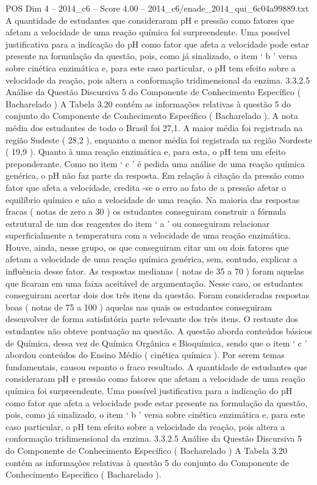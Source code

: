 \begin{textsample}{POS Dim 4 – 2014\_c6 – Score 4.00 – 2014\_c6/enade\_2014\_qui\_6c04a99889.txt}
A quantidade de estudantes que consideraram pH e pressão como fatores que afetam a velocidade de uma reação química foi surpreendente.
Uma possível justificativa para a indicação do pH como fator que afeta a velocidade pode estar presente na formulação da questão, pois, como já sinalizado, o item ‘ b ’ versa sobre cinética enzimática e, para este caso particular, o pH tem efeito sobre a velocidade da reação, pois altera a conformação tridimensional da enzima. 3.3.2.5 Análise da Questão Discursiva 5 do Componente de Conhecimento Específico ( Bacharelado ) A Tabela 3.20 contém as informações relativas à questão 5 do conjunto do Componente de Conhecimento Específico ( Bacharelado ).
A nota média dos estudantes de todo o Brasil foi 27,1.
A maior média foi registrada na região Sudeste ( 28,2 ), enquanto a menor média foi registrada na região Nordeste ( 19,9 ).
Quanto à uma reação enzimática e, para esta, o pH tem um efeito preponderante.
Como no item ‘ c ’ é pedida uma análise de uma reação química genérica, o pH não faz parte da resposta.
Em relação à citação da pressão como fator que afeta a velocidade, credita -se o erro ao fato de a pressão afetar o equilíbrio químico e não a velocidade de uma reação.
Na maioria das respostas fracas ( notas de zero a 30 ) os estudantes conseguiram construir a fórmula estrutural de um dos reagentes do item ‘ a ’ ou conseguiram relacionar superficialmente a temperatura com a velocidade de uma reação enzimática.
Houve, ainda, nesse grupo, os que conseguiram citar um ou dois fatores que afetam a velocidade de uma reação química genérica, sem, contudo, explicar a influência desse fator.
As respostas medianas ( notas de 35 a 70 ) foram aquelas que ficaram em uma faixa aceitável de argumentação.
Nesse caso, os estudantes conseguiram acertar dois dos três itens da questão.
Foram consideradas respostas boas ( notas de 75 a 100 ) aquelas nas quais os estudantes conseguiram desenvolver de forma satisfatória parte relevante dos três itens.
O restante dos estudantes não obteve pontuação na questão.
A questão aborda conteúdos básicos de Química, dessa vez de Química Orgânica e Bioquímica, sendo que o item ‘ c ’ abordou conteúdos do Ensino Médio ( cinética química ).
Por serem temas fundamentais, causou espanto o fraco resultado.
A quantidade de estudantes que consideraram pH e pressão como fatores que afetam a velocidade de uma reação química foi surpreendente.
Uma possível justificativa para a indicação do pH como fator que afeta a velocidade pode estar presente na formulação da questão, pois, como já sinalizado, o item ‘ b ’ versa sobre cinética enzimática e, para este caso particular, o pH tem efeito sobre a velocidade da reação, pois altera a conformação tridimensional da enzima. 3.3.2.5 Análise da Questão Discursiva 5 do Componente de Conhecimento Específico ( Bacharelado ) A Tabela 3.20 contém as informações relativas à questão 5 do conjunto do Componente de Conhecimento Específico ( Bacharelado ).

\end{textsample}
